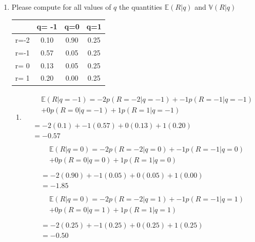 \documentclass[krantz1,ChapterTOCs]{krantz}
\begin{document}
\begin{enumerate}    
    \item Please compute for all values of $q$ the quantities $\mathbb{E}(R|q)$ and $\mathbb{V}(R|q)$
    \begin{table}[ht!]
        \centering
        \begin{tabular}{c|ccc}
             & q= -1 & q=0 & q=1  \\
             \hline
        r=-2 & 0.10  & 0.90 & 0.25 \\
        r=-1 & 0.57  & 0.05 & 0.25 \\
        r= 0 & 0.13  & 0.05 & 0.25 \\
        r= 1 & 0.20  & 0.00 & 0.25 \\
        \end{tabular}
    \end{table}
    \begin{enumerate}
        \item {\color{red}
        \begin{align}
            &\begin{aligned}
                &\mathbb{E}(R|q=-1) = -2 p(R=-2 | q=-1) + -1 p(R=-1 | q=-1)\\
                &+ 0 p(R=0 | q=-1) + 1 p(R=1 | q=-1) \\
            \end{aligned}\\
            & = -2 (0.1) + -1 (0.57) + 0 (0.13) + 1 (0.20)\\
            & = -0.57\\
            \end{align}
            \begin{align}
            &\begin{aligned}
                &\mathbb{E}(R|q=0) = -2 p(R=-2 | q=0) + -1 p(R=-1 | q=0)\\
                &+ 0 p(R=0 | q=0) + 1 p(R=1 | q=0) \\
            \end{aligned}\\
            & = -2 (0.90) + -1 (0.05) + 0 (0.05) + 1 (0.00)\\
            & = -1.85\\
        \end{align} 
        \begin{align}
            &\begin{aligned}
                &\mathbb{E}(R|q=0) = -2 p(R=-2 | q=1) + -1 p(R=-1 | q=1)\\
                &+ 0 p(R=0 | q=1) + 1 p(R=1 | q=1) \\
            \end{aligned}\\
            & = -2 (0.25) + -1 (0.25) + 0 (0.25) + 1 (0.25)\\
            & = -0.50\\
        \end{align} 
        
}
\end{enumerate}
\end{enumerate}
\end{document}
